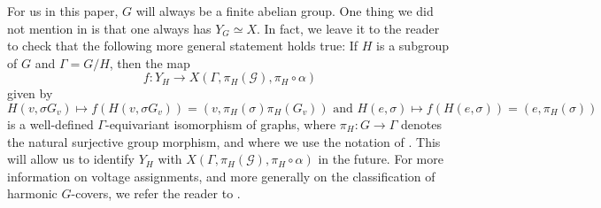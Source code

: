 \documentclass[11pt]{amsart}
\numberwithin{equation}{section}
\theoremstyle{remark}
\theoremstyle{definition}
\begin{document}
For us in this paper, $G$ will always be a finite abelian group.  One thing we did not mention in \cite{Gambheera/Vallieres:2024} is that one always has $Y_{G} \simeq X$.  In fact, we leave it to the reader to check that the following more general statement holds true:  If $H$ is a subgroup of $G$ and $\Gamma = G/H$, then the map 
\begin{equation} \label{identification}
f: Y_{H} \rightarrow X(\Gamma,\pi_{H}(\mathcal{G}),\pi_{H} \circ \alpha)
\end{equation}
given by
$$H (v, \sigma G_{v}) \mapsto f(H (v,\sigma G_{v})) = (v,\pi_{H}(\sigma) \pi_{H}(G_{v})) \text{ and } H(e,\sigma) \mapsto f(H(e,\sigma)) = (e,\pi_{H}(\sigma)) $$
is a well-defined $\Gamma$-equivariant isomorphism of graphs, where $\pi_{H}:G \rightarrow \Gamma$ denotes the natural surjective group morphism, and where we use the notation of \cite[\S 4.2]{Gambheera/Vallieres:2024}.  This will allow us to identify $Y_{H}$ with $X(\Gamma,\pi_{H}(\mathcal{G}),\pi_{H} \circ \alpha)$ in the future.  For more information on voltage assignments, and more generally on the classification of harmonic $G$-covers, we refer the reader to \cite{Len/Ulirsch/Zakharov:2024}.
\end{document}

